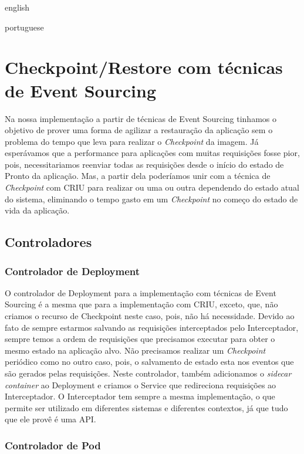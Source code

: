 \begin{otherlanguage*}{english}
\begin{otherlanguage*}{portuguese}
\section{Checkpoint/Restore com técnicas de Event Sourcing}

Na nossa implementação a partir de técnicas de Event Sourcing tinhamos o objetivo de
prover uma forma de agilizar a restauração da aplicação sem o problema do tempo que leva
para realizar o \textit{Checkpoint} da imagem. Já esperávamos que a performance para
aplicações com muitas requisições fosse pior, pois, necessitariamos reenviar todas as
requisições desde o início do estado de Pronto da aplicação. Mas, a partir dela
poderíamos unir com a técnica de \textit{Checkpoint} com CRIU para realizar ou uma ou
outra dependendo do estado atual do sistema, eliminando o tempo gasto em um
\textit{Checkpoint} no começo do estado de vida da aplicação.

\subsection{Controladores}

\subsubsection{Controlador de Deployment}

O controlador de Deployment para a implementação com técnicas de Event Sourcing é a mesma
que para a implementação com CRIU, exceto, que, não criamos o recurso de Checkpoint neste
caso, pois, não há necessidade. Devido ao fato de sempre estarmos salvando as requisições
interceptados pelo Interceptador, sempre temos a ordem de requisições que precisamos
executar para obter o mesmo estado na aplicação alvo. Não precisamos realizar um
\textit{Checkpoint} periódico como no outro caso, pois, o salvamento de estado esta nos
eventos que são gerados pelas requisições. Neste controlador, também adicionamos o 
\textit{sidecar container} ao Deployment e criamos o Service que redireciona requisições
ao Interceptador. O Interceptador tem sempre a mesma implementação, o que permite ser
utilizado em diferentes sistemas e diferentes contextos, já que tudo que ele provê é uma
API.

\subsubsection{Controlador de Pod}


\end{otherlanguage*}
\end{otherlanguage*}
